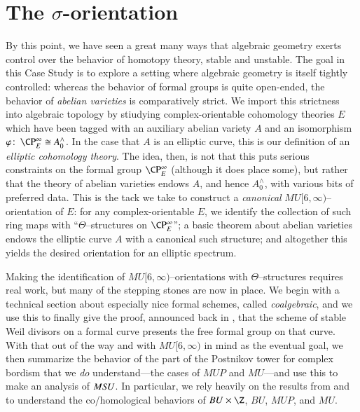 
\chapter{The \texorpdfstring{$\sigma$}{sigma}-orientation}\label{ChapterSigmaOrientation}

By this point, we have seen a great many ways that algebraic geometry exerts control over the behavior of homotopy theory, stable and unstable.  The goal in this Case Study is to explore a setting where algebraic geometry is itself tightly controlled: whereas the behavior of formal groups is quite open-ended, the behavior of \emph{abelian varieties} is comparatively strict.  We import this strictness into algebraic topology by stiudying complex-orientable cohomology theories $E$ which have been tagged with an auxiliary abelian variety $A$ and an isomorphism $\phi\co \CP^\infty_E \cong A^\wedge_0$.  In the case that $A$ is an elliptic curve, this is our definition of an \textit{elliptic cohomology theory}.  The idea, then, is not that this puts serious constraints on the formal group $\CP^\infty_E$ (although it does place some), but rather that the theory of abelian varieties endows $A$, and hence $A^\wedge_0$, with various bits of preferred data.  This is the tack we take to construct a \emph{canonical} $MU[6, \infty)$--orientation of $E$: for any complex-orientable $E$, we identify the collection of such ring maps with ``$\Theta$--structures on $\CP^\infty_E$''; a basic theorem about abelian varieties endows the elliptic curve $A$ with a canonical such structure; and altogether this yields the desired orientation for an elliptic spectrum.

Making the identification of $MU[6, \infty)$--orientations with $\Theta$--structures requires real work, but many of the stepping stones are now in place.  We begin with a technical section about especially nice formal schemes, called \textit{coalgebraic}, and we use this to finally give the proof, announced back in , that the scheme of stable Weil divisors on a formal curve presents the free formal group on that curve.  With that out of the way and with $MU[6, \infty)$ in mind as the eventual goal, we then summarize the behavior of the part of the Postnikov tower for complex bordism that we \emph{do} understand---the cases of $MUP$ and $MU$---and use this to make an analysis of $M\mathit{SU}$.  In particular, we rely heavily on the results from  and  to understand the co/homological behaviors of $BU \times \Z$, $BU$, $MUP$, and $MU$.

